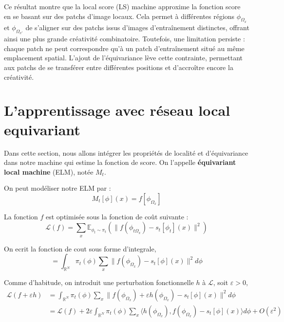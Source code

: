 \documentclass[a4paper,10pt]{article}
\theoremstyle{definition} %
\theoremstyle{definition} %
\theoremstyle{definition} %
\theoremstyle{definition} %
\newcommand{\R}{\mathbb{R}}
\begin{document}
Ce résultat montre que la local score (LS) machine approxime la fonction score en se basant sur des patchs d’image locaux. Cela permet à différentes régions \( \phi_{\Omega_x} \) et \( \phi_{\Omega_{x'}} \) de s’aligner sur des patchs issus d’images d’entraînement distinctes, offrant ainsi une plus grande créativité combinatoire. Toutefois, une limitation persiste : chaque patch ne peut correspondre qu’à un patch d’entraînement situé au même emplacement spatial. L’ajout de l’équivariance lève cette contrainte, permettant aux patchs de se transférer entre différentes positions et d’accroître encore la créativité.

\section{L'apprentissage avec réseau local equivariant}
Dans cette section, nous allons intégrer les propriétés de localité et d'équivariance dans notre machine qui estime la fonction de score. On l'appelle \textbf{équivariant local machine} (ELM), notée $M_t$.

On peut modéliser notre ELM par :
\begin{equation*}
    M_t[\phi](x) = f \left[ \phi_{\Omega_x} \right]
\end{equation*}

La fonction $f$ est optimisée sous la fonction de coût suivante :
\begin{equation*}
    \mathcal{L}(f) = \sum\limits_x \mathbb{E}_{\phi_t \sim \pi_t} \left( \| f(\phi_{t\Omega_x}) - s_t [\phi_t](x) \|^2 \right)
\end{equation*}

On ecrit la fonction de cout sous forme d'integrale,
\begin{equation*}
    = \int_{\R^N} \pi_t(\phi) \sum\limits_x \| f(\phi_{\Omega_x}) - s_t [\phi](x) \|^2 d\phi
\end{equation*}

Comme d'habitude, on introduit une perturbation fonctionnelle $h$ à $\mathcal{L}$, soit $\varepsilon > 0$,
\begin{align*}
    \mathcal{L}(f + \varepsilon h) &= \int_{\R^N} \pi_t(\phi) \sum\limits_x \| f(\phi_{\Omega_x}) + \varepsilon h(\phi_{\Omega_x}) - s_t [\phi](x) \|^2 d\phi\\
    &= \mathcal{L}(f) + 2\varepsilon \int_{\R^N} \pi_t(\phi) \sum\limits_x \langle h(\phi_{\Omega_x}), f(\phi_{\Omega_x}) - s_t [\phi](x) \rangle d\phi + O(\varepsilon^2)
\end{align*}
\end{document}
